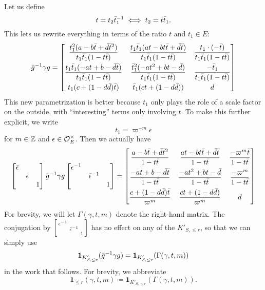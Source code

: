 Let us define \[ t = t_2 \bar t_1 ^{-1} \iff t_2 = t \bar t_1. \]
This lets us rewrite everything in terms of the ratio $t$ and $t_1 \in E$:
\[
  \bar g ^{-1} \gamma g
  =
  \begin{bmatrix}
    \dfrac{t_1^2(a-b\bar t+\bar d \bar t^2)}{t_1 \bar t_1(1-t \bar t)}
    & \dfrac{t_1 \bar t_1(at-bt\bar t+\bar d \bar t)}{t_1 \bar t_1(1-t \bar t)}
    & \dfrac{t_1 \cdot (-\bar t)}{t_1 \bar t_1 (1-t \bar t)} \\[2ex]
    \dfrac{t_1\bar t_1(-at+b-\bar d \bar t)}{t_1 \bar t_1(1-t \bar t)}
    & \dfrac{\bar t_1^2(-at^2+bt-\bar d)}{t_1 \bar t_1(1-t \bar t)}
    & \dfrac{-\bar t_1}{t_1 \bar t_1(1-t \bar t)} \\[2ex]
    t_1(c + (1-d\bar d)\bar t) & \bar t_1(ct + (1-d \bar d)) & d
  \end{bmatrix}
\]
This new parametrization is better because $t_1$ only plays the role of
a scale factor on the outside, with ``interesting'' terms only involving $t$.
To make this further explicit, we write
\[ t_1 = \varpi^{-m} \epsilon \]
for $m \in \mathbb Z$ and $\epsilon \in \mathcal O_E^\times$.
Then we actually have
\[
  \begin{bmatrix} \bar\epsilon \\ & \epsilon \\ & & 1 \end{bmatrix}
  \bar g ^{-1} \gamma g
  \begin{bmatrix} \epsilon^{-1} \\ & \bar\epsilon^{-1} \\ & & 1 \end{bmatrix}
  =
  \begin{bmatrix}
    \dfrac{a-b\bar t+\bar d \bar t^2}{1-t \bar t}
    & \dfrac{at-bt\bar t+\bar d \bar t}{1-t \bar t}
    & \dfrac{-\varpi^m \bar t}{1-t \bar t} \\[2ex]
    \dfrac{-at+b-\bar d \bar t}{1-t \bar t}
    & \dfrac{-at^2+bt-\bar d}{1-t \bar t}
    & \dfrac{-\varpi^m}{1-t \bar t} \\[2ex]
    \dfrac{c + (1-d\bar d)\bar t}{\varpi^m} & \dfrac{ct + (1-d \bar d)}{\varpi^m} & d
  \end{bmatrix}
\]
For brevity, we will let $\Gamma(\gamma, t, m)$ denote the right-hand matrix.
The conjugation by
$\left[ \begin{smallmatrix} \epsilon^{-1} \\ & \bar\epsilon^{-1} \\ & & 1 \end{smallmatrix} \right]$
has no effect on any of the $K'_{S, \le r}$, so that we can simply use
\[ \mathbf{1}_{K'_{S, \le r}}(\bar g ^{-1} \gamma g) = \mathbf{1}_{K'_{S, \le r}}(\Gamma(\gamma, t, m)) \]
in the work that follows.
For brevity, we abbreviate
\[ \mathbf{1}_{\le r}(\gamma, t, m) \coloneqq \mathbf{1}_{K'_{S, \le r}}(\Gamma(\gamma, t, m)). \]

